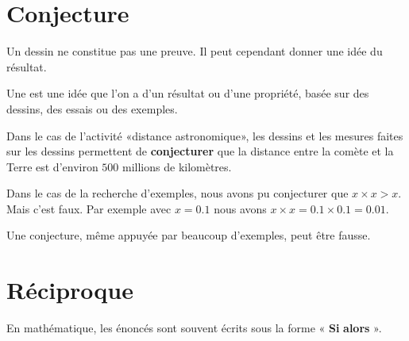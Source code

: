 


\section{Conjecture}

\begin{Aretenir}
    Un dessin ne constitue pas une preuve. Il peut cependant donner une idée du résultat.
\end{Aretenir}

\begin{definition}
    Une  est une idée que l'on a d'un résultat ou d'une propriété, basée sur des dessins, des essais ou des exemples.
\end{definition}

\begin{example}
    Dans le cas de l'activité «distance astronomique», les dessins et les mesures faites sur les dessins permettent de {\bf conjecturer} que la distance entre la comète et la Terre est d'environ \( 500\) millions de kilomètres.
\end{example}

Dans le cas de la recherche d'exemples, nous avons pu conjecturer que \( x\times x >x\). Mais c'est faux. Par exemple avec \( x=0.1\) nous avons \( x\times x=0.1\times 0.1=0.01\).

\begin{Aretenir}
    Une conjecture, même appuyée par beaucoup d'exemples, peut être fausse.
\end{Aretenir}

\section{Réciproque}

En mathématique, les énoncés sont souvent écrits sous la forme « {\bf Si}  {\bf alors} ».

